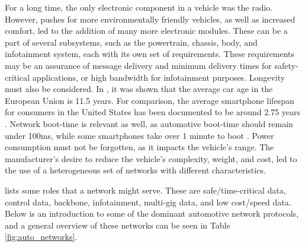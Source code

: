 For a long time, the only electronic component in a vehicle was the radio. However, pushes for more environmentally friendly vehicles, as well as increased comfort, led to the addition of many more electronic modules. These can be a part of several subsystems, such as the powertrain, chassis, body, and infotainment system, each with its own set of requirements. These requirements may be an assurance of message delivery and minimum delivery times for safety-critical applications, or high bandwidth for infotainment purposes. Longevity must also be considered. In \cite{AvgCarAge}, it was shown that the average car age in the European Union is 11.5 years. For comparison, the average smartphone lifespan for consumers in the United States has been documented to be around 2.75 years \citep{AvgPhoneAge}. Network boot-time is relevant as well, as automotive boot-time should remain under 100ms, while some smartphones take over 1 minute to boot \citep{AutomotiveNetworks}. Power consumption must not be forgotten, as it impacts the vehicle's range. The manufacturer's desire to reduce the vehicle's complexity, weight, and cost, led to the use of a heterogeneous set of networks with different characteristics.\par

\cite{AutomotiveNetworks} lists some roles that a network might serve. These are safe/time-critical data, control data, backbone, infotainment, multi-gig data, and low cost/speed data. Below is an introduction to some of the dominant automotive network protocols, and a general overview of these networks can be seen in Table \ref{fig:auto_networks}.

